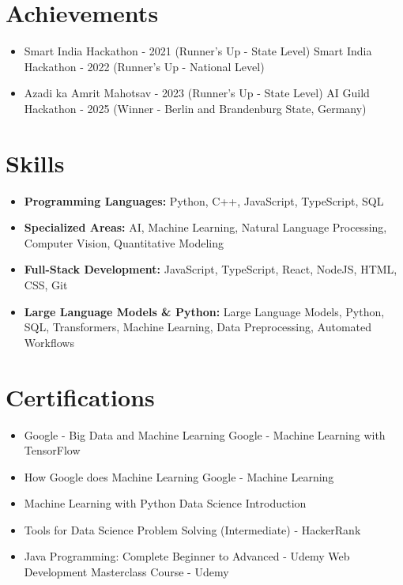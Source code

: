 \documentclass[a4paper,10pt]{article}
\begin{document}
\section*{Achievements}
\begin{itemize}
\item Smart India Hackathon - 2021 (Runner's Up - State Level) \hfill Smart India Hackathon - 2022 (Runner's Up - National Level)
\item Azadi ka Amrit Mahotsav - 2023 (Runner's Up - State Level) \hfill AI Guild Hackathon - 2025 (Winner - Berlin and Brandenburg State, Germany)
\end{itemize}

\section*{Skills}
\begin{itemize}
  \item \textbf{Programming Languages:} Python, C++, JavaScript, TypeScript, SQL
  \item \textbf{Specialized Areas:} AI, Machine Learning, Natural Language Processing, Computer Vision, Quantitative Modeling
  \item \textbf{Full-Stack Development:} JavaScript, TypeScript, React, NodeJS, HTML, CSS, Git
  \item \textbf{Large Language Models \& Python:} Large Language Models, Python, SQL, Transformers, Machine Learning, Data Preprocessing, Automated Workflows
\end{itemize}

\section*{Certifications}
\begin{itemize}
\item Google - Big Data and Machine Learning \hfill Google - Machine Learning with TensorFlow
\item How Google does Machine Learning \hfill Google - Machine Learning
\item Machine Learning with Python \hfill Data Science Introduction
\item Tools for Data Science \hfill Problem Solving (Intermediate) - HackerRank
\item Java Programming: Complete Beginner to Advanced - Udemy \hfill Web Development Masterclass Course - Udemy
\end{itemize}
\end{document}
